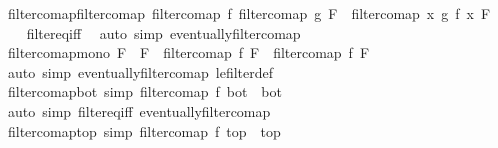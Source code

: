\begin{isabellebody}
\endisatagproof
{\isafoldproof}%
%
\isadelimproof
\isanewline
%
\endisadelimproof
\isanewline
{}\isamarkupfalse%
\ filtercomap{\isacharunderscore}{\kern0pt}filtercomap{\isacharcolon}{\kern0pt}\ {\isachardoublequoteopen}filtercomap\ f\ {\isacharparenleft}{\kern0pt}filtercomap\ g\ F{\isacharparenright}{\kern0pt}\ {\isacharequal}{\kern0pt}\ filtercomap\ {\isacharparenleft}{\kern0pt}{\isasymlambda}x{\isachardot}{\kern0pt}\ g\ {\isacharparenleft}{\kern0pt}f\ x{\isacharparenright}{\kern0pt}{\isacharparenright}{\kern0pt}\ F{\isachardoublequoteclose}\isanewline
%
\isadelimproof
\ \ %
\endisadelimproof
%
\isatagproof
{}\isamarkupfalse%
\ filter{\isacharunderscore}{\kern0pt}eq{\isacharunderscore}{\kern0pt}iff\ \isamarkupfalse%
\ {\isacharparenleft}{\kern0pt}auto\ simp{\isacharcolon}{\kern0pt}\ eventually{\isacharunderscore}{\kern0pt}filtercomap{\isacharparenright}{\kern0pt}%
\endisatagproof
{\isafoldproof}%
%
\isadelimproof
\isanewline
%
\endisadelimproof
\ \ \isanewline
{}\isamarkupfalse%
\ filtercomap{\isacharunderscore}{\kern0pt}mono{\isacharcolon}{\kern0pt}\ {\isachardoublequoteopen}F\ {\isasymle}\ F{\isacharprime}{\kern0pt}\ {\isasymLongrightarrow}\ filtercomap\ f\ F\ {\isasymle}\ filtercomap\ f\ F{\isacharprime}{\kern0pt}{\isachardoublequoteclose}\isanewline
%
\isadelimproof
\ \ %
\endisadelimproof
%
\isatagproof
{}\isamarkupfalse%
\ {\isacharparenleft}{\kern0pt}auto\ simp{\isacharcolon}{\kern0pt}\ eventually{\isacharunderscore}{\kern0pt}filtercomap\ le{\isacharunderscore}{\kern0pt}filter{\isacharunderscore}{\kern0pt}def{\isacharparenright}{\kern0pt}%
\endisatagproof
{\isafoldproof}%
%
\isadelimproof
\isanewline
%
\endisadelimproof
\isanewline
{}\isamarkupfalse%
\ filtercomap{\isacharunderscore}{\kern0pt}bot\ {\isacharbrackleft}{\kern0pt}simp{\isacharbrackright}{\kern0pt}{\isacharcolon}{\kern0pt}\ {\isachardoublequoteopen}filtercomap\ f\ bot\ {\isacharequal}{\kern0pt}\ bot{\isachardoublequoteclose}\isanewline
%
\isadelimproof
\ \ %
\endisadelimproof
%
\isatagproof
{}\isamarkupfalse%
\ {\isacharparenleft}{\kern0pt}auto\ simp{\isacharcolon}{\kern0pt}\ filter{\isacharunderscore}{\kern0pt}eq{\isacharunderscore}{\kern0pt}iff\ eventually{\isacharunderscore}{\kern0pt}filtercomap{\isacharparenright}{\kern0pt}%
\endisatagproof
{\isafoldproof}%
%
\isadelimproof
\isanewline
%
\endisadelimproof
\isanewline
{}\isamarkupfalse%
\ filtercomap{\isacharunderscore}{\kern0pt}top\ {\isacharbrackleft}{\kern0pt}simp{\isacharbrackright}{\kern0pt}{\isacharcolon}{\kern0pt}\ {\isachardoublequoteopen}filtercomap\ f\ top\ {\isacharequal}{\kern0pt}\ top{\isachardoublequoteclose}\isanewline

\end{isabellebody}
